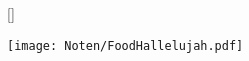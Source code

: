 []

\markboth{\songtitle}{\songtitle} 

\beginverse
\endverse

\centering\texttt{[image: Noten/FoodHallelujah.pdf]}

\endsong

\beginscripture{}

\endscripture

\begin{intersong}

\end{intersong}